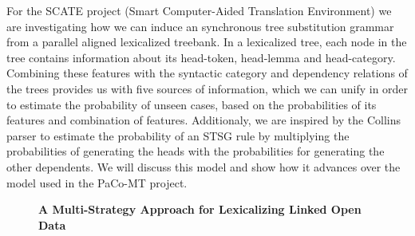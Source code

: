 \documentclass[10pt, a4paper, twopage, headinclude, footinclude, BCOR5mm]{scrartcl}
\begin{document}
\noindent
For the SCATE project (Smart Computer-Aided Translation Environment) we are investigating how we can induce an synchronous tree substitution grammar from a parallel aligned lexicalized treebank. In a lexicalized tree, each node in the tree contains information about its head-token, head-lemma and head-category. Combining these features with the syntactic category and dependency relations of the trees provides us with five sources of information, which we can unify in order to estimate the probability of unseen cases, based on the probabilities of its features and combination of features. Additionaly, we are inspired by the Collins parser to estimate the probability of an STSG rule by multiplying the probabilities of generating the heads with the probabilities for generating the other dependents. We will discuss this model and show how it advances over the model used in the PaCo-MT project. 


\newpage

\begin{figure}[t!]
\centering
\large\textbf{A Multi-Strategy Approach for Lexicalizing Linked Open Data}
\vspace*{0.5cm}
\end{figure}


        \begin{table}[t!]
    \end{table}
\end{document}

